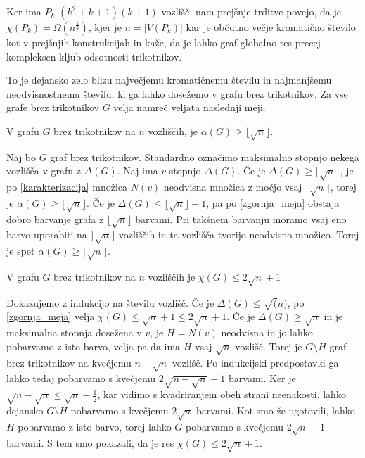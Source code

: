 \documentclass[mat1, tisk]{fmfdelo}
\begin{document}
Ker ima $P_k$ $(k^2 + k + 1)(k + 1)$ vozlišč, nam prejšnje trditve povejo, da je $\chi(P_k) = \Omega(n^{\frac{1}{3}})$, kjer je $n = |V(P_k)|$ kar je občutno večje kromatično število kot v prejšnjih konstrukcijah in kaže, da je lahko graf globalno res precej kompleksen
kljub odsotnosti trikotnikov.

To je dejansko zelo blizu največjemu kromatičnemu številu in najmanjšemu neodvisnostnemu številu, ki ga lahko dosežemo v grafu brez trikotnikov. Za vse grafe brez trikotnikov $G$ velja namreč veljata naslednji meji.

    \begin{trditev}
        V grafu $G$ brez trikotnikov na $n$ vozliščih, je $\alpha(G) \geq \lfloor\sqrt{n}\rfloor$.
    \end{trditev}

    \begin{dokaz}
        Naj bo $G$ graf brez trikotnikov. Standardno označimo maksimalno stopnjo nekega vozlišča v grafu z $\Delta(G)$. Naj ima $v$ stopnjo $\Delta(G)$. Če je $\Delta(G) \geq \lfloor\sqrt{n}\rfloor$, je po \ref{karakterizacija} množica $N(v)$ neodvisna množica z močjo vsaj 
        $\lfloor\sqrt{n}\rfloor$, torej je $\alpha(G) \geq \lfloor\sqrt{n}\rfloor$. Če je $\Delta(G) \leq \lfloor\sqrt{n}\rfloor - 1$, pa po \ref{zgornja_meja} obstaja dobro barvanje grafa z $\lfloor\sqrt{n}\rfloor$ barvami. Pri takšnem barvanju moramo vsaj eno barvo uporabiti
        na $\lfloor\sqrt{n}\rfloor$ vozliščih in ta vozlišča tvorijo neodvisno množico. Torej je spet $\alpha(G) \geq \lfloor\sqrt{n}\rfloor$.
    \end{dokaz}

    \begin{trditev}
        V grafu $G$ brez trikotnikov na $n$ vozliščih je $\chi(G) \leq 2\sqrt{n} + 1$
    \end{trditev}

    \begin{dokaz}
        Dokazujemo z indukcijo na številu vozlišč. Če je $\Delta(G) \leq \sqrt(n)$, po \ref{zgornja_meja} velja $\chi(G) \leq \sqrt{n} + 1 \leq 2\sqrt{n} + 1$. Če je $\Delta(G) \geq \sqrt{n}$ in je maksimalna stopnja dosežena v $v$, je $H = N(v)$ neodvisna in jo lahko pobarvamo z isto barvo, velja
        pa da ima $H$ vsaj $\sqrt{n}$ vozlišč. Torej je $G \setminus H$ graf brez trikotnikov na kvečjemu $n - \sqrt{n}$ vozlišč. Po indukcijski predpostavki ga lahko tedaj pobarvamo s kvečjemu $2\sqrt{n - \sqrt{n}} + 1$ barvami. Ker je $\sqrt{n - \sqrt{n}} \leq \sqrt{n} - \frac{1}{2}$, kar vidimo
        s kvadriranjem obeh strani neenakosti, lahko dejansko $G \setminus H$ pobarvamo s kvečjemu $2\sqrt{n}$ barvami. Kot smo že ugotovili, lahko $H$ pobarvamo z isto barvo, torej lahko $G$ pobarvamo s kvečjemu $2\sqrt{n} + 1$ barvami. S tem smo pokazali, da je res $\chi(G) \leq 2\sqrt{n} + 1$.
    \end{dokaz}
\end{document}
